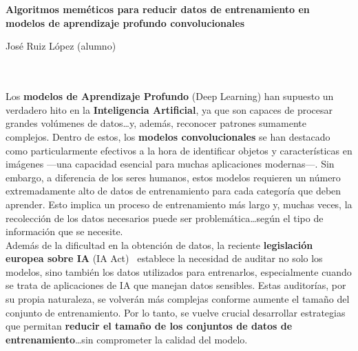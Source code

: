 \chapter*{}



\cleardoublepage
\thispagestyle{empty}

\begin{center}
{\large\bfseries Algoritmos meméticos para reducir datos de entrenamiento en modelos de aprendizaje profundo
convolucionales}\\
\end{center}
\begin{center}
José Ruiz López (alumno)\\
\end{center}

\\

\vspace{0.7cm}
\\

Los \textbf{modelos de Aprendizaje Profundo} (Deep Learning) han supuesto un verdadero hito en la
\textbf{Inteligencia Artificial}, ya que son capaces de procesar grandes volúmenes de datos\ldots y, además, reconocer
patrones sumamente complejos.
Dentro de estos, los \textbf{modelos convolucionales} se han destacado como particularmente efectivos a la hora de
identificar objetos y características en imágenes —una capacidad esencial para muchas aplicaciones modernas—.
Sin embargo, a diferencia de los seres humanos, estos modelos requieren un número extremadamente alto de datos de
entrenamiento para cada categoría que deben aprender.
Esto implica un proceso de entrenamiento más largo y, muchas veces, la recolección de los datos necesarios puede ser
problemática\ldots según el tipo de información que se necesite. \\[6pt]

Además de la dificultad en la obtención de datos, la reciente \textbf{legislación europea sobre IA} (IA Act)~\cite{}
establece la necesidad de auditar no solo los modelos, sino también los datos utilizados para entrenarlos,
especialmente cuando se trata de aplicaciones de IA que manejan datos sensibles.
Estas auditorías, por su propia naturaleza, se volverán más complejas conforme aumente el tamaño del conjunto de
entrenamiento.
Por lo tanto, se vuelve crucial desarrollar estrategias que permitan
\textbf{reducir el tamaño de los conjuntos de datos de entrenamiento}\ldots sin comprometer la calidad del modelo.
\\[6pt]

